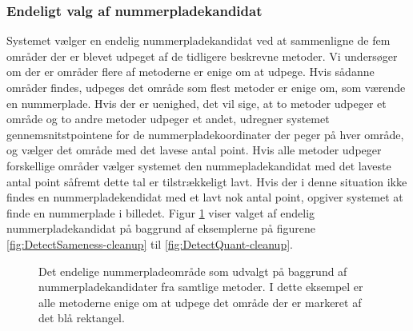 \subsubsection{Endeligt valg af nummerpladekandidat}
Systemet vælger en endelig nummerpladekandidat ved at sammenligne de fem områder der er blevet udpeget af de tidligere beskrevne metoder. Vi undersøger om der er områder flere af metoderne er enige om at udpege. Hvis sådanne områder findes, udpeges det område som flest metoder er enige om, som værende en nummerplade. Hvis der er uenighed, det vil sige, at to metoder udpeger et område og to andre metoder udpeger et andet,  udregner systemet gennemsnitstpointene for de nummerpladekoordinater der peger på hver område, og vælger det område med det lavese antal point. Hvis alle metoder udpeger forskellige områder vælger systemet den nummepladekandidat med det laveste antal point såfremt dette tal er tilstrækkeligt lavt. Hvis der i denne situation ikke findes en nummerpladekendidat med et lavt nok antal point, opgiver systemet at finde en nummerplade i billedet. Figur \ref{fig:DetectMain-result} viser valget af endelig nummerpladekandidat på baggrund af eksemplerne på figurene \ref{fig:DetectSameness-cleanup} til \vref{fig:DetectQuant-cleanup}. %

\begin{figure}[htp]
  \centering
  \caption{Det endelige nummerpladeområde som udvalgt på baggrund af nummerpladekandidater fra samtlige metoder. I dette eksempel er alle metoderne enige om at udpege det område der er markeret af det blå rektangel.}
  \label{fig:DetectMain-result}  
\end{figure}

